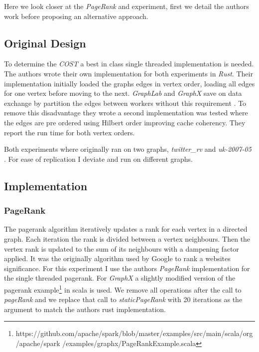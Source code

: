 Here we look closer at the \textit{PageRank} and  experiment, first we detail the authors work before proposing an alternative approach.

\subsection{Original Design} \label{sec:hilbert}
To determine the \textit{COST} a best in class single threaded implementation is needed. The authors wrote their own implementation for both experiments in \textit{Rust}. Their implementation initially loaded the graphs edges in vertex order, loading all edges for one vertex before moving to the next. \textit{GraphLab} and \textit{GraphX} save on data exchange by partition the edges between workers without this requirement \cite{graphlab,graphx}. To remove this disadvantage they wrote a second implementation was tested where the edges are pre ordered using Hilbert order improving cache coherency. They report the run time for both vertex orders.

Both experiments where originally ran on two graphs, \textit{twitter\_rv} \cite{twitter} and \textit{uk-2007-05} \cite{uk2007}. For ease of replication I deviate and run on different graphs.

\subsection{Implementation} \label{sec:hilbert}
\subsubsection{PageRank}
The pagerank algorithm iteratively updates a rank for each vertex in a directed graph. Each iteration the rank is divided between a vertex neighbours. Then the vertex rank is updated to the sum of its neighbours with a dampening factor applied. It was the originally algorithm used by Google to rank a websites significance. For this experiment I use the authors \textit{PageRank} implementation for the single threaded pagerank. For \textit{GraphX} a slightly modified version of the pagerank example\footnote{https://github.com/apache/spark/blob/master/examples/src/main/scala/org/apache/spark /examples/graphx/PageRankExample.scala} in scala is used. We remove all operations after the call to \textit{pageRank} and we replace that call to \textit{staticPageRank} with 20 iterations as the argument to match the authors rust implementation.

